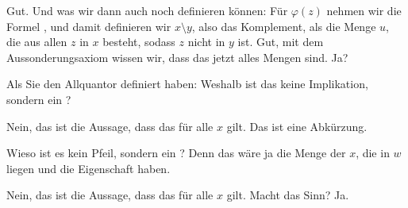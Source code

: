\begin{math-stroke}
\end{math-stroke}

\begin{spoken-clean}[00:36:56 - 00:38:38]
Gut. Und was wir dann auch noch definieren können: Für $\varphi(z)$ nehmen wir die Formel , und damit definieren wir $x \setminus y$, also das Komplement, als die Menge $u$, die aus allen $z$ in $x$ besteht, sodass $z$ nicht in $y$ ist. Gut, mit dem Aussonderungsaxiom wissen wir, dass das jetzt alles Mengen sind. Ja?
\end{spoken-clean}

\begin{student-interaction}[Studentenfrage]
Als Sie den Allquantor definiert haben: Weshalb ist das keine Implikation, sondern ein ?
\end{student-interaction}

\begin{spoken-clean}[continued]
Nein, das ist die Aussage, dass das für alle $x$ gilt. Das ist eine Abkürzung.
\end{spoken-clean}

\begin{student-interaction}[Studentenfrage]
Wieso ist es kein Pfeil, sondern ein ? Denn das wäre ja die Menge der $x$, die in $w$ liegen und die Eigenschaft haben.
\end{student-interaction}

\begin{spoken-clean}[continued]
Nein, das ist die Aussage, dass das für alle $x$ gilt. Macht das Sinn? Ja.
\end{spoken-clean}

